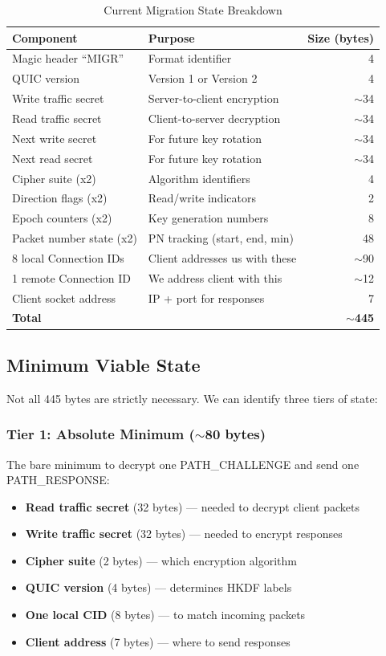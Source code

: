 \documentclass[11pt,a4paper]{article}
\begin{document}
\begin{table}[h]
\centering
\caption{Current Migration State Breakdown}
\begin{tabular}{llr}
\toprule
\textbf{Component} & \textbf{Purpose} & \textbf{Size (bytes)} \\
\midrule
Magic header ``MIGR'' & Format identifier & 4 \\
QUIC version & Version 1 or Version 2 & 4 \\
Write traffic secret & Server-to-client encryption & $\sim$34 \\
Read traffic secret & Client-to-server decryption & $\sim$34 \\
Next write secret & For future key rotation & $\sim$34 \\
Next read secret & For future key rotation & $\sim$34 \\
Cipher suite (x2) & Algorithm identifiers & 4 \\
Direction flags (x2) & Read/write indicators & 2 \\
Epoch counters (x2) & Key generation numbers & 8 \\
Packet number state (x2) & PN tracking (start, end, min) & 48 \\
8 local Connection IDs & Client addresses us with these & $\sim$90 \\
1 remote Connection ID & We address client with this & $\sim$12 \\
Client socket address & IP + port for responses & 7 \\
\midrule
\textbf{Total} & & $\sim$\textbf{445} \\
\bottomrule
\end{tabular}
\end{table}

\subsection{Minimum Viable State}

Not all 445 bytes are strictly necessary. We can identify three tiers of state:

\subsubsection{Tier 1: Absolute Minimum ($\sim$80 bytes)}

The bare minimum to decrypt one PATH\_CHALLENGE and send one PATH\_RESPONSE:

\begin{itemize}
    \item \textbf{Read traffic secret} (32 bytes) --- needed to decrypt client packets
    \item \textbf{Write traffic secret} (32 bytes) --- needed to encrypt responses
    \item \textbf{Cipher suite} (2 bytes) --- which encryption algorithm
    \item \textbf{QUIC version} (4 bytes) --- determines HKDF labels
    \item \textbf{One local CID} (8 bytes) --- to match incoming packets
    \item \textbf{Client address} (7 bytes) --- where to send responses
\end{itemize}
\end{document}
